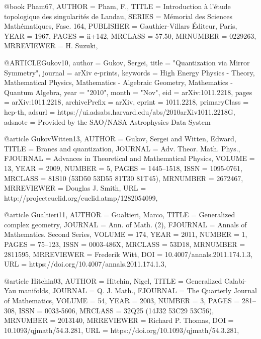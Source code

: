 @book {Pham67,
    AUTHOR = {Pham, F.},
     TITLE = {Introduction \`a l'\'{e}tude topologique des singularit\'{e}s de
              {L}andau},
    SERIES = {M\'{e}morial des Sciences Math\'{e}matiques, Fasc. 164},
 PUBLISHER = {Gauthier-Villars \'{E}diteur, Paris},
      YEAR = {1967},
     PAGES = {ii+142},
   MRCLASS = {57.50},
  MRNUMBER = {0229263},
MRREVIEWER = {H. Suzuki},
}

@ARTICLE{Gukov10,
       author = {{Gukov}, Sergei},
        title = "{Quantization via Mirror Symmetry}",
      journal = {arXiv e-prints},
     keywords = {High Energy Physics - Theory, Mathematical Physics, Mathematics - Algebraic Geometry, Mathematics - Quantum Algebra},
         year = "2010",
        month = "Nov",
          eid = {arXiv:1011.2218},
        pages = {arXiv:1011.2218},
archivePrefix = {arXiv},
       eprint = {1011.2218},
 primaryClass = {hep-th},
       adsurl = {https://ui.adsabs.harvard.edu/abs/2010arXiv1011.2218G},
      adsnote = {Provided by the SAO/NASA Astrophysics Data System}
}

@article {GukovWitten13,
    AUTHOR = {Gukov, Sergei and Witten, Edward},
     TITLE = {Branes and quantization},
   JOURNAL = {Adv. Theor. Math. Phys.},
  FJOURNAL = {Advances in Theoretical and Mathematical Physics},
    VOLUME = {13},
      YEAR = {2009},
    NUMBER = {5},
     PAGES = {1445--1518},
      ISSN = {1095-0761},
   MRCLASS = {81S10 (53D50 53D55 81T30 81T45)},
  MRNUMBER = {2672467},
MRREVIEWER = {Douglas J. Smith},
       URL = {http://projecteuclid.org/euclid.atmp/1282054099},
}

@article {Gualtieri11,
    AUTHOR = {Gualtieri, Marco},
     TITLE = {Generalized complex geometry},
   JOURNAL = {Ann. of Math. (2)},
  FJOURNAL = {Annals of Mathematics. Second Series},
    VOLUME = {174},
      YEAR = {2011},
    NUMBER = {1},
     PAGES = {75--123},
      ISSN = {0003-486X},
   MRCLASS = {53D18},
  MRNUMBER = {2811595},
MRREVIEWER = {Frederik Witt},
       DOI = {10.4007/annals.2011.174.1.3},
       URL = {https://doi.org/10.4007/annals.2011.174.1.3},
}

@article {Hitchin03,
    AUTHOR = {Hitchin, Nigel},
     TITLE = {Generalized {C}alabi-{Y}au manifolds},
   JOURNAL = {Q. J. Math.},
  FJOURNAL = {The Quarterly Journal of Mathematics},
    VOLUME = {54},
      YEAR = {2003},
    NUMBER = {3},
     PAGES = {281--308},
      ISSN = {0033-5606},
   MRCLASS = {32Q25 (14J32 53C29 53C56)},
  MRNUMBER = {2013140},
MRREVIEWER = {Richard P. Thomas},
       DOI = {10.1093/qjmath/54.3.281},
       URL = {https://doi.org/10.1093/qjmath/54.3.281},
}

